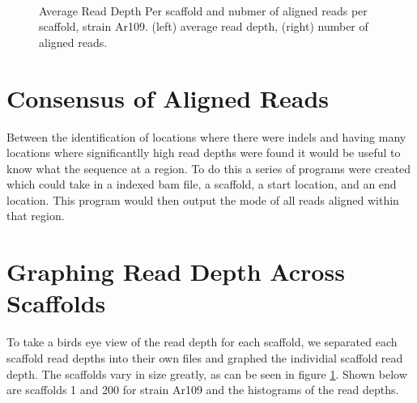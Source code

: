 \documentclass[12pt]{article}
\begin{document}
\begin{figure}[H]
	\begin{centering}

		\\
		\begin{singlespace}
			\vspace{-0.5cm}
			\caption[Average Read Depth Per scaffold, strain Ar109.]{Average Read Depth Per scaffold and nubmer of aligned reads per scaffold, strain Ar109. (left) average read depth, (right) number of aligned reads.}\label{109avgcountgraph}
		\end{singlespace}
	\end{centering}
\end{figure}

%
%
\section{Consensus of Aligned Reads}
	Between the identification of locations where there were indels and having many locations where significantlly high read depths were found it would be useful to know what the sequence at a region. To do this a series of programs were created which could take in a indexed bam file, a scaffold, a start location, and an end location. This program would then output the mode of all reads aligned within that region. 


%
%
\section{Graphing Read Depth Across Scaffolds}
	To take a birds eye view of the read depth for each scaffold, we separated each scaffold read depths into their own files and graphed the individial scaffold read depth. The scaffolds vary in size greatly, as can be seen in figure \ref{109avgcountgraph}. Shown below are scaffolds 1 and 200 for strain Ar109 and the histograms of the read depths.
\end{document}
